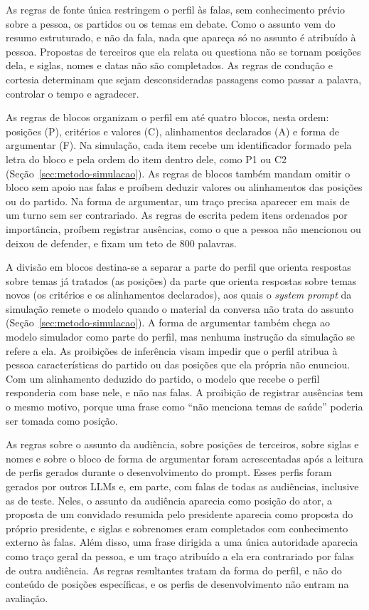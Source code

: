 As regras de fonte única restringem o perfil às falas, sem conhecimento prévio sobre a pessoa, os
partidos ou os temas em debate. Como o assunto vem do resumo estruturado, e não da fala, nada que
apareça só no assunto é atribuído à pessoa. Propostas de terceiros que ela relata ou questiona não se
tornam posições dela, e siglas, nomes e datas não são completados. As regras de condução e cortesia
determinam que sejam desconsideradas passagens como passar a palavra, controlar o tempo e agradecer.

As regras de blocos organizam o perfil em até quatro blocos, nesta ordem: posições (P), critérios e
valores (C), alinhamentos declarados (A) e forma de argumentar (F). Na simulação, cada item recebe um
identificador formado pela letra do bloco e pela ordem do item dentro dele, como P1 ou C2
(Seção~\ref{sec:metodo-simulacao}). As regras de blocos também mandam omitir o bloco sem apoio nas
falas e proíbem deduzir valores ou alinhamentos das posições ou do partido. Na forma de argumentar,
um traço precisa aparecer em mais de um turno sem ser contrariado. As regras de escrita pedem itens ordenados por importância,
proíbem registrar ausências, como o que a pessoa não mencionou ou deixou de defender, e fixam um teto
de 800 palavras.

A divisão em blocos destina-se a separar a parte do perfil que orienta respostas sobre temas já
tratados (as posições) da parte que orienta respostas sobre temas novos (os critérios e os
alinhamentos declarados), aos quais o \textit{system prompt} da simulação remete o modelo quando o
material da conversa não trata do assunto (Seção~\ref{sec:metodo-simulacao}). A forma de argumentar
também chega ao modelo simulador como parte do perfil, mas nenhuma instrução da simulação se refere a
ela. As proibições de inferência visam impedir que o perfil atribua à pessoa características do partido ou das posições
que ela própria não enunciou. Com um alinhamento deduzido do partido, o modelo que recebe o perfil
responderia com base nele, e não nas falas. A proibição de registrar ausências tem o mesmo motivo,
porque uma frase como ``não menciona temas de saúde'' poderia ser tomada como posição.

As regras sobre o assunto da audiência, sobre posições de terceiros, sobre siglas e nomes e sobre o
bloco de forma de argumentar foram acrescentadas após a leitura de perfis gerados durante o desenvolvimento do
prompt. Esses perfis foram gerados por outros LLMs e, em parte, com falas de todas as audiências,
inclusive as de teste. Neles, o assunto da audiência aparecia como posição do ator, a proposta de um
convidado resumida pelo presidente aparecia como proposta do próprio presidente, e siglas e sobrenomes
eram completados com conhecimento externo às falas. Além disso, uma frase dirigida a uma única
autoridade aparecia como traço geral da pessoa, e um traço atribuído a ela era contrariado por falas
de outra audiência. As regras resultantes tratam da forma do perfil, e não do conteúdo de posições
específicas, e os perfis de desenvolvimento não entram na avaliação.

